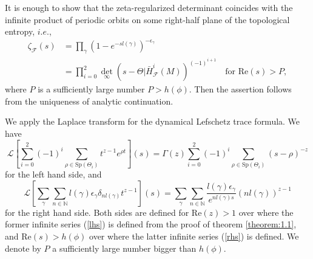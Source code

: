 It is enough to show that the zeta-regularized determinant coincides with the infinite product of periodic orbits on some right-half plane of the topological entropy, $i.e.$,
\begin{equation*}
    \begin{split}
        \zeta_{\mathcal{F}}(s) 
        &= \prod_{\gamma}(1-e^{-sl(\gamma)})^{-\epsilon_{\gamma}}\\
        &= \prod_{i=0}^{2}\det_{\infty}(s-\Theta|\bar{H}^{i}_{\mathcal{F}}(M))^{(-1)^{i+1}} \quad\text{for }\mathrm{Re}(s)>{P},
    \end{split}
\end{equation*}
where $P$ is a sufficiently large number $P>h(\phi)$.
Then the assertion follows from the uniqueness of analytic continuation.


We apply the Laplace transform for the dynamical Lefschetz trace formula.
We have
\begin{equation}\label{lhs}
    \mathcal{L}\left[ \sum_{i=0}^{2}(-1)^{i}\sum_{\rho\in\mathrm{Sp}(\Theta_{i})} t^{z-1}e^{\rho{t}} \right](s) = \Gamma(z)\sum_{i=0}^{2}(-1)^{i}\sum_{\rho\in\mathrm{Sp}(\Theta_{i})}(s-\rho)^{-z}
\end{equation}
for the left hand side, and
\begin{equation}\label{rhs}
    \mathcal{L}\left[ \sum_{\gamma}\sum_{n\in\mathbb{N}}l(\gamma)\epsilon_{\gamma}\delta_{nl(\gamma)}t^{z-1} \right](s) 
    = \sum_{\gamma}\sum_{n\in\mathbb{N}}\frac{l(\gamma)\epsilon_{\gamma}}{e^{nl(\gamma)s}}(nl(\gamma))^{z-1}
\end{equation}
for the right hand side.
Both sides are defined for $\mathrm{Re}(z)>1$ over where the former infinite series (\ref{lhs}) is defined from the proof of theorem \ref{theorem:1.1}, and $\mathrm{Re}(s)> h(\phi)$ over where the latter infinite series (\ref{rhs}) is defined.
We denote by $P$ a sufficiently large number bigger than $h(\phi)$.


